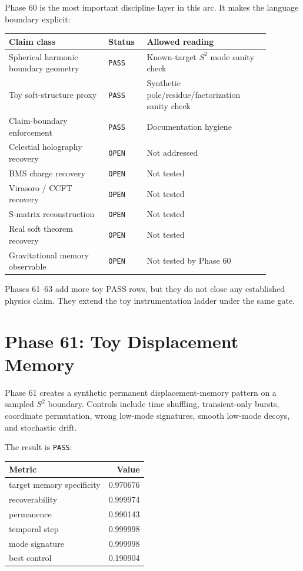 \documentclass[11pt]{article}
\begin{document}
Phase 60 is the most important discipline layer in this arc. It makes the language boundary explicit:
\begin{center}
\small
\begin{tabular}{p{0.34\linewidth}p{0.12\linewidth}p{0.42\linewidth}}
\toprule
Claim class & Status & Allowed reading \\
\midrule
Spherical harmonic boundary geometry & \texttt{PASS} & Known-target $S^2$ mode sanity check \\
Toy soft-structure proxy & \texttt{PASS} & Synthetic pole/residue/factorization sanity check \\
Claim-boundary enforcement & \texttt{PASS} & Documentation hygiene \\
Celestial holography recovery & \texttt{OPEN} & Not addressed \\
BMS charge recovery & \texttt{OPEN} & Not tested \\
Virasoro / CCFT recovery & \texttt{OPEN} & Not tested \\
S-matrix reconstruction & \texttt{OPEN} & Not tested \\
Real soft theorem recovery & \texttt{OPEN} & Not tested \\
Gravitational memory observable & \texttt{OPEN} & Not tested by Phase 60 \\
\bottomrule
\end{tabular}
\end{center}

Phases 61--63 add more toy PASS rows, but they do not close any established physics claim. They extend the toy instrumentation ladder under the same gate.

\section{Phase 61: Toy Displacement Memory}

Phase 61 creates a synthetic permanent displacement-memory pattern on a sampled $S^2$ boundary. Controls include time shuffling, transient-only bursts, coordinate permutation, wrong low-mode signatures, smooth low-mode decoys, and stochastic drift.

The result is \texttt{PASS}:
\begin{center}
\begin{tabular}{lr}
\toprule
Metric & Value \\
\midrule
target memory specificity & 0.970676 \\
recoverability & 0.999974 \\
permanence & 0.990143 \\
temporal step & 0.999998 \\
mode signature & 0.999998 \\
best control & 0.190904 \\
\bottomrule
\end{tabular}
\end{center}
\end{document}
